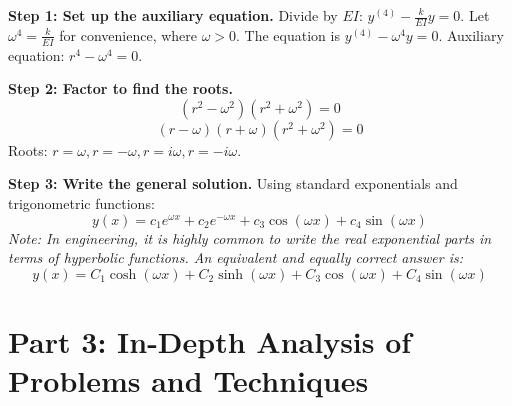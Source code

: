 \documentclass[11pt]{article}
\begin{document}
\textbf{Step 1: Set up the auxiliary equation.}
Divide by $EI$: $y^{(4)} - \frac{k}{EI} y = 0$.
Let $\omega^4 = \frac{k}{EI}$ for convenience, where $\omega > 0$. The equation is $y^{(4)} - \omega^4 y = 0$.
Auxiliary equation: $r^4 - \omega^4 = 0$.

\textbf{Step 2: Factor to find the roots.}
\[ (r^2 - \omega^2)(r^2 + \omega^2) = 0 \]
\[ (r - \omega)(r + \omega)(r^2 + \omega^2) = 0 \]
Roots: $r = \omega, r = -\omega, r = i\omega, r = -i\omega$.

\textbf{Step 3: Write the general solution.}
Using standard exponentials and trigonometric functions:
\[ y(x) = c_1 e^{\omega x} + c_2 e^{-\omega x} + c_3 \cos(\omega x) + c_4 \sin(\omega x) \]
\textit{Note: In engineering, it is highly common to write the real exponential parts in terms of hyperbolic functions. An equivalent and equally correct answer is:}
\[ y(x) = C_1 \cosh(\omega x) + C_2 \sinh(\omega x) + C_3 \cos(\omega x) + C_4 \sin(\omega x) \]

\newpage
\section{Part 3: In-Depth Analysis of Problems and Techniques}
\end{document}
